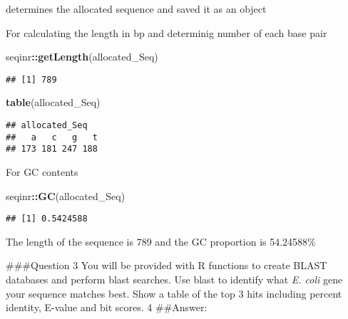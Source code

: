 \documentclass[]{article}
\newenvironment{Shaded}{\begin{snugshade}}{\end{snugshade}}
\newcommand{\DataTypeTok}[1]{\textcolor[rgb]{0.13,0.29,0.53}{#1}}
\newcommand{\KeywordTok}[1]{\textcolor[rgb]{0.13,0.29,0.53}{\textbf{#1}}}
\newcommand{\NormalTok}[1]{#1}
\newcommand{\OperatorTok}[1]{\textcolor[rgb]{0.81,0.36,0.00}{\textbf{#1}}}
\newcommand{\StringTok}[1]{\textcolor[rgb]{0.31,0.60,0.02}{#1}}
\begin{document}
determines the allocated sequence and saved it as an object

\begin{Shaded}
\end{Shaded}

For calculating the length in bp and determinig number of each base pair

\begin{Shaded}
\begin{Highlighting}[]
\NormalTok{seqinr}\OperatorTok{::}\KeywordTok{getLength}\NormalTok{(allocated_Seq)}
\end{Highlighting}
\end{Shaded}

\begin{verbatim}
## [1] 789
\end{verbatim}

\begin{Shaded}
\begin{Highlighting}[]
\KeywordTok{table}\NormalTok{(allocated_Seq)}
\end{Highlighting}
\end{Shaded}

\begin{verbatim}
## allocated_Seq
##   a   c   g   t 
## 173 181 247 188
\end{verbatim}

For GC contents

\begin{Shaded}
\begin{Highlighting}[]
\NormalTok{seqinr}\OperatorTok{::}\KeywordTok{GC}\NormalTok{(allocated_Seq)}
\end{Highlighting}
\end{Shaded}

\begin{verbatim}
## [1] 0.5424588
\end{verbatim}

The length of the sequence is 789 and the GC proportion is 54.24588\%

\#\#\#Question 3 You will be provided with R functions to create BLAST
databases and perform blast searches. Use blast to identify what
\emph{E. coli} gene your sequence matches best. Show a table of the top
3 hits including percent identity, E-value and bit scores. 4 \#\#Answer:
\end{document}
